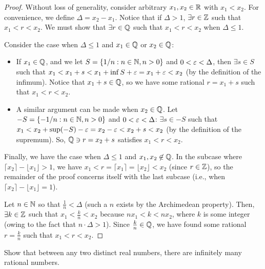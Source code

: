 \begin{proof}
  Without loss of generality, consider arbitrary $x_{1}, x_{2} \in \mathbb{R}$ with
  $x_{1} < x_{2}$. For convenience, we define $\Delta = x_{2} - x_{1}$. Notice
  that if $\Delta > 1$, $\exists r \in \mathbb{Z}$ such that $x_1 < r < x_2$. We must
  show that $\exists r \in \mathbb{Q}$ such that $x_{1} < r < x_{2}$ when $\Delta \leq 1$.

  Consider the case when $\Delta \leq 1$ and $x_{1} \in \mathbb{Q}$ or $x_{2} \in \mathbb{Q}$:
  \begin{itemize}
    \item If $x_{1} \in \mathbb{Q}$, and we let $S = \{ 1/n : n \in \mathbb{N}, n > 0 \}$ and
      $0 < \varepsilon < \Delta$, then $\exists s \in S$ such that 
      $x_{1} < x_{1} + s < x_{1} + \inf S + \varepsilon = x_{1} + \varepsilon < x_{2}$ (by the definition 
      of the infimum). Notice that $x_1 + s \in \mathbb{Q}$, so we have some rational 
      $r = x_{1} + s$ such that $x_{1} < r < x_{2}$. 
    \item A similar argument can be made when $x_{2} \in \mathbb{Q}$. Let $-S = \{ -1/n : n \in \mathbb{N}, n > 0 \}$
      and $0 < \varepsilon < \Delta$: $\exists s \in -S$ such that 
      $x_{1} < x_{2} + \sup(-S) - \varepsilon = x_{2} - \varepsilon < x_{2} + s < x_{2}$ 
      (by the definition of the supremum). So, $\mathbb{Q} \ni r = x_{2} + s$ satisfies $x_{1} < r < x_{2}$.
  \end{itemize}

  Finally, we have the case when $\Delta \leq 1$ and $x_{1}, x_{2} \not\in \mathbb{Q}$.
  In the subcase where $\lceil x_{2} \rceil - \lfloor x_{1} \rfloor > 1$,
  we have $x_{1} < r = \lceil x_{1} \rceil = \lfloor x_{2} \rfloor < x_{2}$ 
  (since $r \in \mathbb{Z}$), so the remainder of the proof concerns itself with the
  last subcase (i.e., when $\lceil x_{2} \rceil - \lfloor x_{1} \rfloor = 1$).

  Let $n \in \mathbb{N}$ so that $\frac{1}{n} < \Delta$ (such a $n$ exists by the Archimedean property). 
  Then, $\exists k \in \mathbb{Z}$ such that $x_{1} < \frac{k}{n} < x_{2}$ because $nx_{1} < k < nx_{2}$, 
  where $k$ is some integer (owing to the fact that $n \cdot \Delta > 1$). 
  Since $\frac{k}{n} \in \mathbb{Q}$, we have found some rational $r = \frac{k}{n}$ such that $x_{1} < r < x_{2}$. 
\end{proof}

\begin{problem}\label{prob:infinite-rationals-in-reals}
  Show that between any two distinct real numbers, there are infinitely many rational numbers.
\end{problem}


